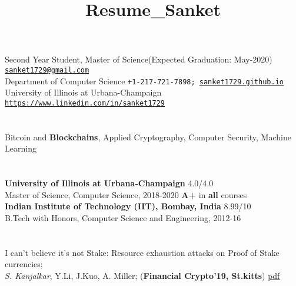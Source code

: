 \documentclass[margin,line]{resume}
\title{Resume_Sanket}
\begin{document}
\begin{resume}


%
    \section{}
    Second Year Student, Master of Science(Expected Graduation: May-2020)                           \hfill \texttt{\href{mailto:sanket1729@gmail.com}{sanket1729@gmail.com}} \\ 																		
    Department of Computer Science       \hfill \texttt{+1-217-721-7898; \href{sanket1729.github.io}{sanket1729.github.io}}			                \\
    University of Illinois at Urbana-Champaign \hfill \texttt{\href{https://www.linkedin.com/in/sanket1729}{\small https://www.linkedin.com/in/sanket1729}}\newline \\

      \vspace{-10mm} 
   \section{} 
    Bitcoin and \textbf{Blockchains}, Applied Cryptography, Computer Security, Machine Learning\\
      \vspace*{-7.5mm}

 \section{}
 \textbf{University of Illinois at Urbana-Champaign} \hfill 4.0/4.0\\
 \hspace{35pt} Master of Science, Computer Science, 2018-2020 \hfill \textbf{A+} in \textbf{all} courses \\
 \textbf{Indian Institute of Technology (IIT), Bombay, India} \hfill 8.99/10 \\
 B.Tech with Honors, Computer Science and Engineering, 2012-16

\vspace{-4mm}

\section{}
I can't believe it's not Stake: Resource exhaustion attacks on Proof of Stake currencies; \\\textit{S. Kanjalkar}, Y.Li, J.Kuo, A. Miller; (\textbf{Financial Crypto'19, St.kitts}) \hfill \href{http://fc19.ifca.ai/preproceedings/180-preproceedings.pdf}{\underline{pdf}} \\


\end{resume}
\end{document}
